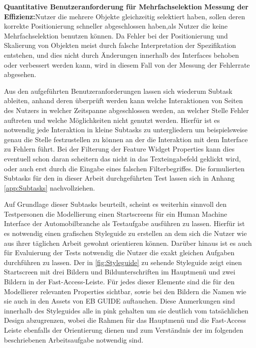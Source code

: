 \textbf{Quantitative Benutzeranforderung für Mehrfachselektion}\newline
\textbf{Messung der Effizienz:}Nutzer die mehrere Objekte gleichzeitig selektiert haben, sollen deren korrekte Positionierung schneller abgeschlossen haben,als Nutzer die keine Mehrfachselektion benutzen können.\newline
Da Fehler bei der Positionierung und Skalierung von Objekten meist durch falsche Interpretation der Spezifikation entstehen, und dies nicht durch Änderungen innerhalb des Interfaces behoben oder verbessert werden kann, wird in diesem Fall von der Messung der Fehlerrate abgesehen.

Aus den aufgeführten Benutzeranforderungen lassen sich wiederum Subtask ableiten, anhand deren überprüft werden kann welche Interaktionen von Seiten des Nutzers in welcher Zeitspanne abgeschlossen werden, an welcher Stelle Fehler auftreten und welche Möglichkeiten nicht genutzt werden.
Hierfür ist es notwendig jede Interaktion in kleine Subtasks zu untergliedern um beispielsweise genau die Stelle festzustellen zu können an der die Interaktion mit dem Interface zu Fehlern führt.
Bei der Filterung der Feature Widget Properties kann dies eventuell schon daran scheitern das nicht in das Texteingabefeld geklickt wird, oder auch erst durch die Eingabe eines falschen Filterbegriffes.
Die formulierten Subtasks für den in dieser Arbeit durchgeführten Test lassen sich in Anhang \ref{app:Subtasks} nachvollziehen.

Auf Grundlage dieser Subtasks beurteilt, scheint es weiterhin sinnvoll den Testpersonen die Modellierung einen Startscreens für ein Human Machine Interface der Automobilbranche als Testaufgabe ausführen zu lassen.
Hierfür ist es notwendig einen grafischen Styleguide zu erstellen an dem sich die Nutzer wie aus ihrer täglichen Arbeit gewohnt orientieren können.
Darüber hinaus ist es auch für Evaluierung der Tests notwendig die Nutzer die exakt gleichen Aufgaben durchführen zu lassen.
Der in \cref{fig:Styleguide} zu sehende Styleguide zeigt einen Startscreen mit drei Bildern und Bildunterschriften im Hauptmenü und zwei Bildern in der Fast-Access-Leiste.
Für jedes dieser Elemente sind die für den Modellierer relevanten Properties sichtbar, sowie bei den Bildern die Namen wie sie auch in den Assets von EB GUIDE auftauchen.
Diese Anmerkungen sind innerhalb des Styleguides alle in pink gehalten um sie deutlich vom tatsächlichen Design abzugrenzen, wobei die Rahmen für das Hauptmenü und die Fast-Access Leiste ebenfalls der Orientierung dienen und zum Verständnis der im folgenden beschriebenen Arbeitsaufgabe notwendig sind.

